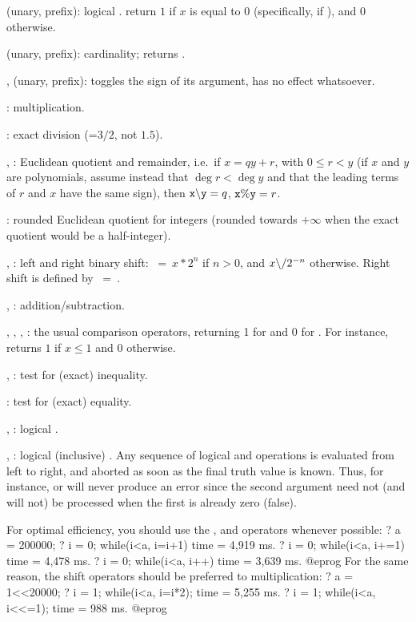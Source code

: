 %
\kbd{!} (unary, prefix): logical .  return $1$ if $x$ is
equal to $0$ (specifically, if ), and $0$ otherwise.

\kbd{\#} (unary, prefix): cardinality;  returns .

%
\kbd{+}, \kbd{-} (unary, prefix): \kbd{-} toggles the sign of its argument,
\kbd{+} has no effect whatsoever.

%
\kbd{*}: multiplication.

\kbd{/}: exact division (=$3/2$, not $1.5$).

\kbd{\bs}, \kbd{\%}: Euclidean quotient and remainder, i.e.~if $x =
qy + r$, with $0\le r < y$ (if $x$ and $y$ are polynomials, assume instead
that $\deg r< \deg y$ and that the leading terms of $r$ and $x$ have the
same sign), then $\kbd{x \b{ } y} = q$, ${\tt x\%y} = r$.

\kbd{\bs/}: rounded Euclidean quotient for integers (rounded towards
$+\infty$ when the exact quotient would be a half-integer).

\kbd{<<}, \kbd{>>}: left and right binary shift: $~=~x * 2^n$
if $n>0$, and $x \b{/} 2^{-n}$ otherwise. Right shift is defined by
$~=~$.

%
\kbd{+}, \kbd{-}: addition/subtraction.

%
\kbd{<}, \kbd{>}, \kbd{<=}, \kbd{>=}: the usual comparison operators,
returning 1 for  and 0 for . For instance,
 returns $1$ if $x\le 1$ and $0$ otherwise.

\kbd{<>}, \kbd{!=}: test for (exact) inequality.

\kbd{==}: test for (exact) equality.

%
\kbd{\&}, \kbd{\&\&}: logical .

\kbd{|}, \kbd{||}: logical (inclusive) . Any sequence of logical
 and  operations is evaluated from left to right,
and aborted as soon as the final truth value is known. Thus, for instance,
 or  will never
produce an error since the second argument need not (and will not) be processed
when the first is already zero (false).

 For optimal efficiency, you should use the
\kbd{++}, \kbd{--} and \kbd{=} operators whenever possible:
\bprog
? a = 200000;
? i = 0; while(i<a, i=i+1)
time = 4,919 ms.
? i = 0; while(i<a, i+=1)
time = 4,478 ms.
? i = 0; while(i<a, i++)
time = 3,639 ms.
@eprog
\noindent For the same reason, the shift operators should be preferred to
multiplication:
\bprog
? a = 1<<20000;
? i = 1; while(i<a, i=i*2);
time = 5,255 ms.
? i = 1; while(i<a, i<<=1);
time = 988 ms.
@eprog

